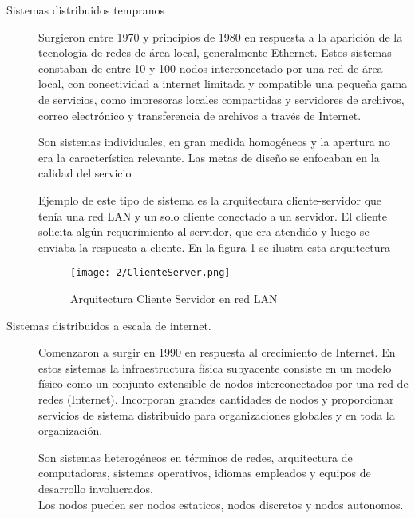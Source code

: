 \begin{description}
	\item[Sistemas distribuidos tempranos] Surgieron entre 1970 y principios de 1980 en respuesta a la aparici\'on  de la tecnología de redes de área local, generalmente Ethernet. Estos sistemas constaban de entre 10 y 100 nodos interconectado por una red de área local, con conectividad a internet limitada y compatible una pequeña gama de servicios, como impresoras locales compartidas y servidores de archivos,  correo electrónico  y transferencia de archivos a través de Internet.  
	 
		\begin{tcolorbox}
		[colback=red!5!white,colframe=red!75!black,fonttitle=\bfseries,title=  Sistemas distribuidos tempranos]
			Son sistemas individuales,  en gran medida homogéneos y  la apertura no era la característica relevante. Las metas de diseño se enfocaban en la calidad del servicio \cite{Coulouris2011}
	\end{tcolorbox}
	
	
	Ejemplo de este tipo de sistema es la arquitectura \gls{cliente-servidor}  que ten\'ia  una red LAN  y un solo cliente conectado a un 	servidor. El cliente solicita  algún requerimiento al servidor, que era atendido y  luego se enviaba la respuesta a cliente. En la figura \ref{fig:ClienteServer} se ilustra  esta arquitectura
	
	\begin{figure}
		  \begin{center}%
		\texttt{[image: 2/ClienteServer.png]}
		\caption{Arquitectura Cliente Servidor en red LAN}
		\label{fig:ClienteServer}
	 \end{center}
  \end{figure} 
	
	\item[Sistemas distribuidos a escala de internet.]  Comenzaron a surgir en  1990 en respuesta al crecimiento de Internet. En estos sistemas la infraestructura física subyacente consiste en un modelo físico como un conjunto extensible de nodos interconectados por una red de redes (Internet).  Incorporan grandes cantidades de nodos y proporcionar servicios de sistema distribuido para organizaciones globales y en toda la organización.   
	
 
	
		\begin{tcolorbox}
		[colback=red!5!white,colframe=red!75!black,fonttitle=\bfseries,title=Sistemas distribuidos a escala de internet]
		Son sistemas heterogéneos en términos de redes, arquitectura de computadoras, sistemas operativos, idiomas empleados y equipos de desarrollo involucrados. \\Los nodos pueden ser \gls{nodos estaticos},  \gls{nodos discretos} y \gls {nodos autonomos}.
	\end{tcolorbox}
	

\end{description}
